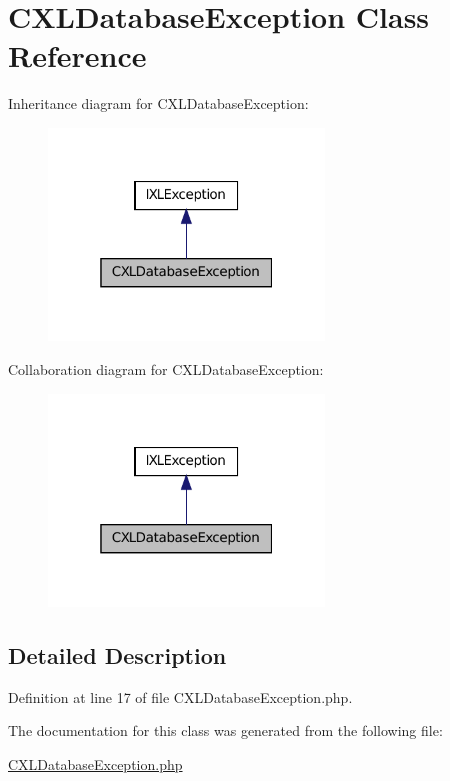 \hypertarget{classCXLDatabaseException}{
\section{CXLDatabaseException Class Reference}
\label{classCXLDatabaseException}
}


Inheritance diagram for CXLDatabaseException:\nopagebreak
\begin{figure}[H]
\begin{center}
\leavevmode
\includegraphics[width=208pt]{classCXLDatabaseException__inherit__graph}
\end{center}
\end{figure}


Collaboration diagram for CXLDatabaseException:\nopagebreak
\begin{figure}[H]
\begin{center}
\leavevmode
\includegraphics[width=208pt]{classCXLDatabaseException__coll__graph}
\end{center}
\end{figure}


\subsection{Detailed Description}


Definition at line 17 of file CXLDatabaseException.php.



The documentation for this class was generated from the following file:\begin{DoxyCompactItemize}
\item 
\hyperlink{CXLDatabaseException_8php}{CXLDatabaseException.php}\end{DoxyCompactItemize}
